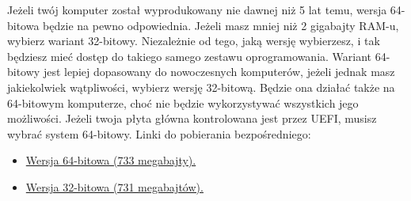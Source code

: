 Jeżeli twój komputer został wyprodukowany nie dawnej niż 5 lat temu, wersja 64-bitowa będzie na pewno odpowiednia. Jeżeli masz mniej niż 2 gigabajty RAM-u, wybierz wariant 32-bitowy. Niezależnie od tego, jaką wersję wybierzesz, i tak będziesz mieć dostęp do takiego samego zestawu oprogramowania. Wariant 64-bitowy jest lepiej dopasowany do nowoczesnych komputerów, jeżeli jednak masz jakiekolwiek wątpliwości, wybierz wersję 32-bitową. Będzie ona działać także na 64-bitowym komputerze, choć nie będzie wykorzystywać wszystkich jego możliwości.
Jeżeli twoja płyta główna kontrolowana jest przez UEFI, musisz wybrać system 64-bitowy.
Linki do pobierania bezpośredniego:
\begin{itemize}
\item \href{http://www.ubuntu.com/start-download?distro=desktop&bits=64&release=lts}{Wersja 64-bitowa (733 megabajty).}
\item \href{http://www.ubuntu.com/start-download?distro=desktop&bits=32&release=lts}{Wersja 32-bitowa (731 megabajtów).}
\end{itemize}

